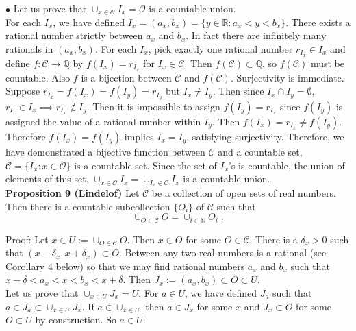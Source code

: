 \documentclass[a4paper]{article}
\begin{document}
$\bullet$ Let us prove that $\cup_{x \in \mathcal{O}} I_x = \mathcal{O}$ is a countable union. \\

For each $I_x$, we have defined $I_x = (a_x,b_x) =\{y \in \mathbb{R} : a_x < y < b_x\}$. There exists a rational number strictly between $a_x$ and $b_x$. In fact there are infinitely many rationals in $(a_x,b_x)$. For each $I_x$, pick exactly one rational number $r_{I_x} \in I_x$ and define $f : \mathcal{C} \rightarrow \mathbb{Q}$ by $f(I_x) = r_{I_x}$ for $I_x \in \mathcal{C}$. Then $f(\mathcal{C}) \subset \mathbb{Q}$, so $f(\mathcal{C})$ must be countable. Also $f$ is a bijection between $\mathcal{C}$ and $f(\mathcal{C})$. Surjectivity is immediate. Suppose $r_{I_x} = f(I_x) = f(I_y) = r_{I_y}$ but $I_x \neq I_y$. Then since $I_x \cap I_y = \emptyset$, $r_{I_x} \in I_x \implies r_{I_x} \not\in I_y$. Then it is impossible to assign $f(I_y) = r_{I_x}$ since $f(I_{y})$ is assigned the value of a rational number within $I_y$. Then $f(I_x) = r_{I_x} \neq f(I_y)$. Therefore $f(I_x) = f(I_y)$ implies $I_x = I_y$, satisfying surjectivity. Therefore, we have demonstrated a bijective function between $\mathcal{C}$ and a countable set, $\mathcal{C} = \{I_x : x \in \mathcal{O}\}$ is a countable set. Since the set of $I_x$'s is countable, the union of elements of this set, $\cup_{x \in \mathcal{O}} I_x = \cup_{I_x \in \mathcal{C}} I_x$ is a countable union. \\

{\bf Proposition 9 (Lindelof)} Let $\mathcal{C}$ be a collection of open sets of real numbers. Then there is a countable subcollection $\{O_i\}$ of $\mathcal{C}$ such that $$\cup_{O \in \mathcal{C}} O= \cup_{i \in \mathbb{N}} O_i \;.$$ 

Proof: Let $x \in U := \cup_{O \in \mathcal{C}}O$. Then $x \in O$ for some $O \in \mathcal{C}$. There is a $\delta_x > 0$ such that $(x-\delta_x, x+ \delta_x) \subset O$. Between any two real numbers is a rational (see Corollary 4 below) so that we may find rational numbers $a_x$ and $b_x$ such that $x-\delta < a_x < x < b_x < x+\delta$. Then $J_x := (a_x,b_x) \subset O \subset U$.\\

Let us prove that $\cup_{x \in U} J_x = U$. For $a \in U$, we have defined $J_a$ such that $a \in J_a \subset \cup_{x \in U} J_x$. If $a \in \cup_{x \in U}$ then $a \in J_x$ for some $x$ and $J_x \subset O$ for some $O \subset U$ by construction. So $a \in U$. \\
\end{document}

